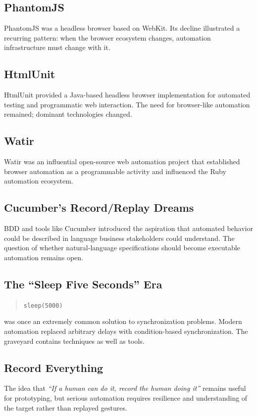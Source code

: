 \documentclass[11pt,twoside]{book}
\begin{document}
\subsection*{PhantomJS}
PhantomJS was a headless browser based on WebKit. Its decline illustrated a recurring pattern: when the browser ecosystem changes, automation infrastructure must change with it.

\subsection*{HtmlUnit}
HtmlUnit provided a Java-based headless browser implementation for automated testing and programmatic web interaction. The need for browser-like automation remained; dominant technologies changed.

\subsection*{Watir}
Watir was an influential open-source web automation project that established browser automation as a programmable activity and influenced the Ruby automation ecosystem.

\subsection*{Cucumber's Record/Replay Dreams}
BDD and tools like Cucumber introduced the aspiration that automated behavior could be described in language business stakeholders could understand. The question of whether natural-language specifications should become executable automation remains open.

\subsection*{The ``Sleep Five Seconds'' Era}
\begin{quote}
\texttt{sleep(5000)}
\end{quote}
was once an extremely common solution to synchronization problems. Modern automation replaced arbitrary delays with condition-based synchronization. The graveyard contains techniques as well as tools.

\subsection*{Record Everything}
The idea that \emph{``If a human can do it, record the human doing it''} remains useful for prototyping, but serious automation requires resilience and understanding of the target rather than replayed gestures.
\end{document}
